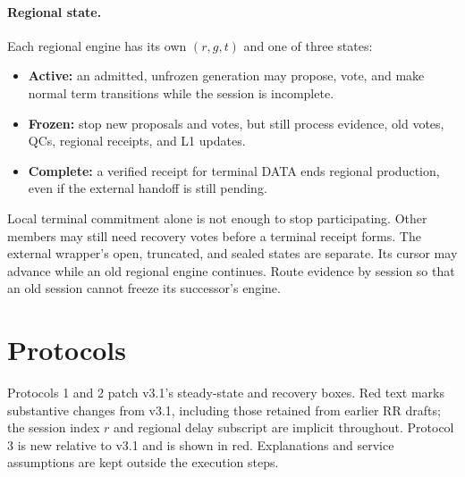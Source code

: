 \documentclass[11pt,a4paper]{article}
\newcounter{protocol}
\begin{document}
\paragraph{Regional state.}
Each regional engine has its own $(r,g,t)$ and one of three states:
\begin{itemize}
\item \textbf{Active:} an admitted, unfrozen generation may propose,
vote, and make normal term transitions while the session is incomplete.
\item \textbf{Frozen:} stop new proposals and votes, but still process
evidence, old votes, QCs, regional receipts, and L1 updates.
\item \textbf{Complete:} a verified receipt for terminal DATA ends
regional production, even if the external handoff is still pending.
\end{itemize}
Local terminal commitment alone is not enough to stop participating.
Other members may still need recovery votes before a terminal receipt forms.
The external wrapper's open, truncated, and sealed states are separate.
Its cursor may advance while an old regional engine continues.
Route evidence by session so that an old session cannot freeze its
successor's engine.

\section{Protocols}
\label{sec:protocols}
Protocols 1 and 2 patch v3.1's steady-state and recovery boxes. Red text
marks substantive changes from v3.1, including those retained from earlier RR drafts;
the session index $r$ and regional delay subscript are implicit throughout.
Protocol 3 is new relative to v3.1 and is shown in red. Explanations and service assumptions are
kept outside the execution steps.
\end{document}
